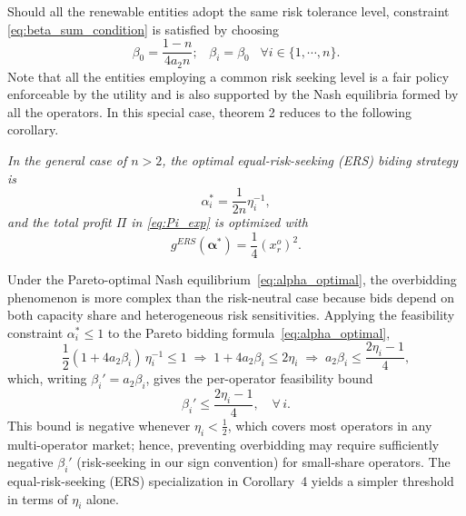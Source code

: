 \documentclass[conference]{IEEEtran}
\begin{document}
Should all the renewable entities adopt 
the same risk tolerance level, constraint \eqref{eq:beta_sum_condition} is satisfied by choosing 
\[  \beta_0= \frac{1-n}{4a_2n}; \;\;\; \beta_i=\beta_0\;\;\; \forall i\in\{1,\cdots,n\}. \]
Note that all the entities employing a common risk seeking level is a fair policy enforceable by the utility and is also supported by the Nash equilibria formed by all the operators. In this special case, theorem 2 reduces to the following corollary. 

 {\it In the general case of $n>2$, the optimal equal-risk-seeking (ERS) biding strategy  is 
\begin{equation}
\alpha_i^* = \frac{1}{2n}\eta_i^{-1}, \label{eq:alpha_optimal_simplified}
\end{equation} 
and the total profit $\Pi$ in \eqref{eq:Pi_exp} is optimized with 
\[ g^{ERS}(\boldsymbol{\alpha}^*)=\frac{1}{4} (x_r^o)^2. \] }

Under the Pareto-optimal Nash equilibrium~\eqref{eq:alpha_optimal}, the overbidding phenomenon is more complex than the risk-neutral case because bids depend on both capacity share and heterogeneous risk sensitivities. Applying the feasibility constraint $\alpha_i^* \leq 1$ to the Pareto bidding formula~\eqref{eq:alpha_optimal},
\[
\frac{1}{2}(1+4a_2\beta_i)\,\eta_i^{-1} \leq 1
\;\Rightarrow\;
1 + 4a_2\beta_i \leq 2\eta_i
\;\Rightarrow\;
a_2\beta_i \leq \frac{2\eta_i-1}{4},
\]
which, writing $\beta_i' = a_2\beta_i$, gives the per-operator feasibility bound
\begin{equation}\label{eq:overbid_bound}
\beta_i' \leq \frac{2\eta_i - 1}{4}, \quad \forall\, i.
\end{equation}
This bound is negative whenever $\eta_i < \frac{1}{2}$, which covers most operators in any multi-operator market; hence, preventing overbidding may require sufficiently negative $\beta_i'$ (risk-seeking in our sign convention) for small-share operators. The equal-risk-seeking (ERS) specialization in Corollary~4 yields a simpler threshold in terms of $\eta_i$ alone.
\end{document}
